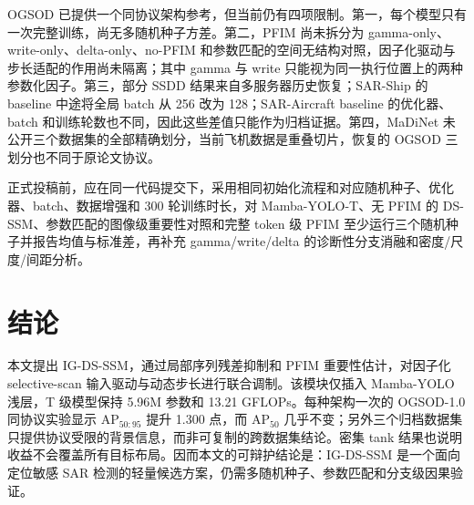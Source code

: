 \documentclass[10pt,twocolumn]{ctexart}
\newcommand{\method}{IG-DS-SSM}
\begin{document}
OGSOD 已提供一个同协议架构参考，但当前仍有四项限制。第一，每个模型只有一次完整训练，尚无多随机种子方差。第二，PFIM 尚未拆分为 gamma-only、write-only、delta-only、no-PFIM 和参数匹配的空间无结构对照，因子化驱动与步长适配的作用尚未隔离；其中 gamma 与 write 只能视为同一执行位置上的两种参数化因子。第三，部分 SSDD 结果来自多服务器历史恢复；SAR-Ship 的 baseline 中途将全局 batch 从 256 改为 128；SAR-Aircraft baseline 的优化器、batch 和训练轮数也不同，因此这些差值只能作为归档证据。第四，MaDiNet 未公开三个数据集的全部精确划分，当前飞机数据是重叠切片，恢复的 OGSOD 三划分也不同于原论文协议。

正式投稿前，应在同一代码提交下，采用相同初始化流程和对应随机种子、优化器、batch、数据增强和 300 轮训练时长，对 Mamba-YOLO-T、无 PFIM 的 DS-SSM、参数匹配的图像级重要性对照和完整 token 级 PFIM 至少运行三个随机种子并报告均值与标准差，再补充 gamma/write/delta 的诊断性分支消融和密度/尺度/间距分析。

\section{结论}

本文提出 \method{}，通过局部序列残差抑制和 PFIM 重要性估计，对因子化 selective-scan 输入驱动与动态步长进行联合调制。该模块仅插入 Mamba-YOLO 浅层，T 级模型保持 5.96M 参数和 13.21 GFLOPs。每种架构一次的 OGSOD-1.0 同协议实验显示 AP$_{50:95}$ 提升 1.300 点，而 AP$_{50}$ 几乎不变；另外三个归档数据集只提供协议受限的背景信息，而非可复制的跨数据集结论。密集 tank 结果也说明收益不会覆盖所有目标布局。因而本文的可辩护结论是：\method{} 是一个面向定位敏感 SAR 检测的轻量候选方案，仍需多随机种子、参数匹配和分支级因果验证。

\begingroup
\footnotesize
\setlength{\bibsep}{0pt}


\endgroup
\end{document}
